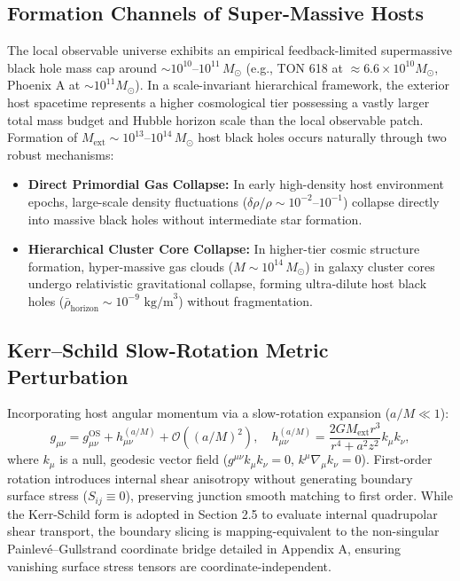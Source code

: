 \documentclass[11pt,a4paper]{article}
\begin{document}
\subsection{Formation Channels of Super-Massive Hosts}\label{sec:formation}
The local observable universe exhibits an empirical feedback-limited supermassive black hole mass cap around $\sim 10^{10} \text{--} 10^{11} \, M_\odot$ (e.g., TON 618 at $\approx 6.6 \times 10^{10} M_\odot$, Phoenix A at $\sim 10^{11} M_\odot$). In a scale-invariant hierarchical framework, the exterior host spacetime represents a higher cosmological tier possessing a vastly larger total mass budget and Hubble horizon scale than the local observable patch. Formation of $M_{\text{ext}} \sim 10^{13} \text{--} 10^{14} \, M_\odot$ host black holes occurs naturally through two robust mechanisms:
\begin{itemize}
    \item \textbf{Direct Primordial Gas Collapse:} In early high-density host environment epochs, large-scale density fluctuations ($\delta\rho/\rho \sim 10^{-2}\text{--}10^{-1}$) collapse directly into massive black holes without intermediate star formation.
    \item \textbf{Hierarchical Cluster Core Collapse:} In higher-tier cosmic structure formation, hyper-massive gas clouds ($M \sim 10^{14} \, M_\odot$) in galaxy cluster cores undergo relativistic gravitational collapse, forming ultra-dilute host black holes ($\bar{\rho}_{\text{horizon}} \sim 10^{-9} \text{ kg/m}^3$) without fragmentation.
\end{itemize}

\subsection{Kerr--Schild Slow-Rotation Metric Perturbation}\label{sec:kerr_extension}
Incorporating host angular momentum via a slow-rotation expansion ($a/M \ll 1$):
\begin{equation}\label{eq:kerr_schild}
    g_{\mu\nu} = g_{\mu\nu}^{\text{OS}} + h_{\mu\nu}^{(a/M)} + \mathcal{O}\left((a/M)^2\right), \quad h_{\mu\nu}^{(a/M)} = \frac{2GM_{\text{ext}}r^3}{r^4 + a^2 z^2} k_\mu k_\nu,
\end{equation}
where $k_\mu$ is a null, geodesic vector field ($g^{\mu\nu} k_\mu k_\nu = 0$, $k^\mu \nabla_\mu k_\nu = 0$). First-order rotation introduces internal shear anisotropy without generating boundary surface stress ($S_{ij} \equiv 0$), preserving junction smooth matching to first order. While the Kerr-Schild form is adopted in Section 2.5 to evaluate internal quadrupolar shear transport, the boundary slicing is mapping-equivalent to the non-singular Painlev\'e--Gullstrand coordinate bridge detailed in Appendix A, ensuring vanishing surface stress tensors are coordinate-independent.
\end{document}
